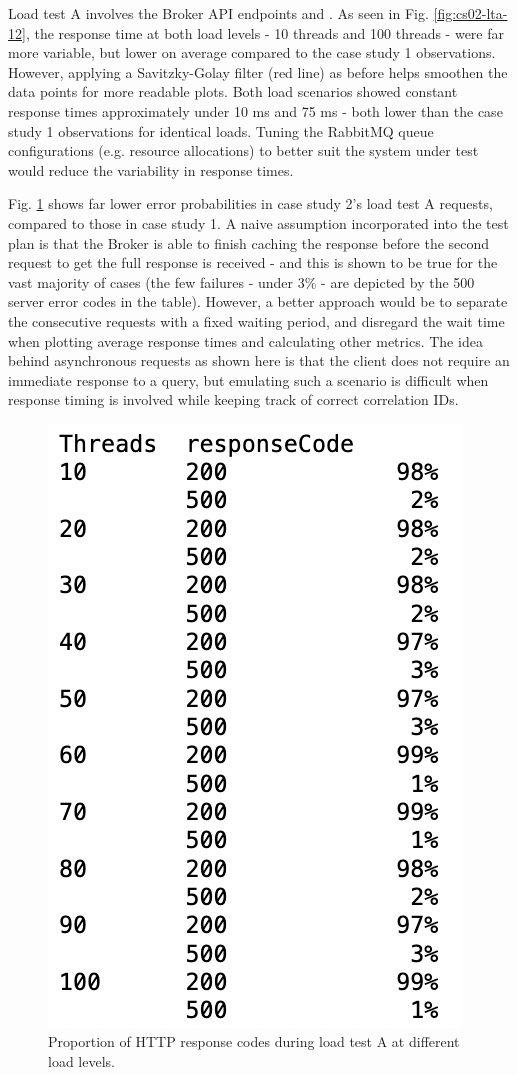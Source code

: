 Load test A involves the Broker API endpoints  and . As seen in Fig. \ref{fig:cs02-lta-12}, the response time at both load levels - 10 threads and 100 threads - were far more variable, but lower on average compared to the case study 1 observations. However, applying a Savitzky-Golay filter (red line) as before helps smoothen the data points for more readable plots. Both load scenarios showed constant response times approximately under 10 ms and 75 ms - both lower than the case study 1 observations for identical loads. Tuning the RabbitMQ queue configurations (e.g. resource allocations) to better suit the system under test would reduce the variability in response times.

Fig. \ref{fig:cs02-lta-3} shows far lower error probabilities in case study 2's load test A requests, compared to those in case study 1. A naive assumption incorporated into the test plan is that the Broker is able to finish caching the response before the second request to get the full response is received - and this is shown to be true for the vast majority of cases (the few failures - under 3\% - are depicted by the 500 server error codes in the table). However, a better approach would be to separate the consecutive requests with a fixed waiting period, and disregard the wait time when plotting average response times and calculating other metrics. The idea behind asynchronous requests as shown here is that the client does not require an immediate response to a query, but emulating such a scenario is difficult when response timing is involved while keeping track of correct correlation IDs.

\begin{figure}[H]
  \centering
  \includegraphics[width=0.35\linewidth]{./assets/images/case-study-02/cs02-lta-3.png}
  \caption{Proportion of HTTP response codes during load test A at different load levels.}
  \label{fig:cs02-lta-3}
\end{figure}

